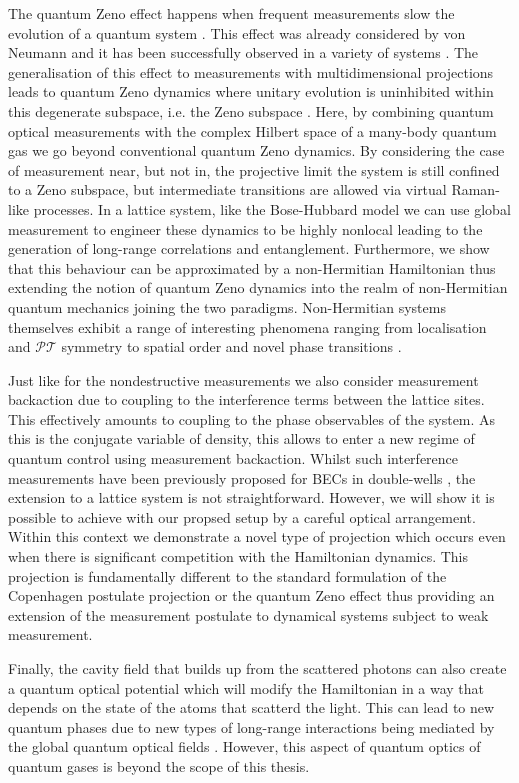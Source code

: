 The quantum Zeno effect happens when frequent measurements slow the
evolution of a quantum system \cite{misra1977, facchi2008}. This
effect was already considered by von Neumann and it has been
successfully observed in a variety of systems \cite{itano1990,
  nagels1997, kwiat1999, balzer2000, streed2006, hosten2006,
  bernu2008}. The generalisation of this effect to measurements with
multidimensional projections leads to quantum Zeno dynamics where
unitary evolution is uninhibited within this degenerate subspace,
i.e. the Zeno subspace \cite{facchi2008, raimond2010, raimond2012,
  signoles2014}. Here, by combining quantum optical measurements with
the complex Hilbert space of a many-body quantum gas we go beyond
conventional quantum Zeno dynamics. By considering the case of
measurement near, but not in, the projective limit the system is still
confined to a Zeno subspace, but intermediate transitions are allowed
via virtual Raman-like processes. In a lattice system, like the
Bose-Hubbard model we can use global measurement to engineer these
dynamics to be highly nonlocal leading to the generation of long-range
correlations and entanglement. Furthermore, we show that this
behaviour can be approximated by a non-Hermitian Hamiltonian thus
extending the notion of quantum Zeno dynamics into the realm of
non-Hermitian quantum mechanics joining the two
paradigms. Non-Hermitian systems themselves exhibit a range of
interesting phenomena ranging from localisation \cite{hatano1996,
  refael2006} and {\selectfont $\mathcal{PT}$
  symmetry} \cite{bender1998, giorgi2010, zhang2013} to spatial order
\cite{otterbach2014} and novel phase transitions \cite{lee2014prx,
  lee2014prl}.

Just like for the nondestructive measurements we also consider
measurement backaction due to coupling to the interference terms
between the lattice sites. This effectively amounts to coupling to the
phase observables of the system. As this is the conjugate variable of
density, this allows to enter a new regime of quantum control using
measurement backaction. Whilst such interference measurements have
been previously proposed for BECs in double-wells \cite{cirac1996,
  castin1997, ruostekoski1997}, the extension to a lattice system is
not straightforward. However, we will show it is possible to achieve
with our propsed setup by a careful optical arrangement. Within this
context we demonstrate a novel type of projection which occurs even
when there is significant competition with the Hamiltonian
dynamics. This projection is fundamentally different to the standard
formulation of the Copenhagen postulate projection or the quantum Zeno
effect \cite{misra1977, facchi2008} thus providing an extension of the
measurement postulate to dynamical systems subject to weak
measurement.

Finally, the cavity field that builds up from the scattered photons
can also create a quantum optical potential which will modify the
Hamiltonian in a way that depends on the state of the atoms that
scatterd the light. This can lead to new quantum phases due to new
types of long-range interactions being mediated by the global quantum
optical fields \cite{caballero2015, caballero2015njp, caballero2016,
  caballero2016a}. However, this aspect of quantum optics of quantum
gases is beyond the scope of this thesis.
